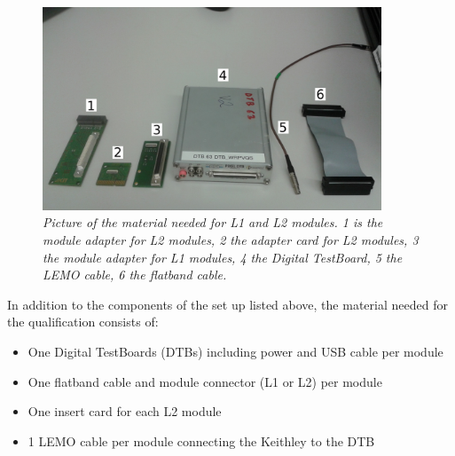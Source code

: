 \documentclass[a4paper,12pt,twoside]{article}
\begin{document}
\begin{figure} [h!] \centering 
\includegraphics[width=0.9\textwidth, angle=0] {./Material.jpg}
\caption{\em  \label{Material}
Picture of the material needed for L1 and L2 modules. 1 is the module adapter for L2 modules, 2 the adapter card for L2 modules, 3 the module adapter for L1 modules, 4 the Digital TestBoard, 5 the LEMO cable, 6 the flatband cable.}
\end{figure}

In addition to the components of the set up listed above, the material needed for the qualification consists of:

\begin{itemize}
\item One Digital TestBoards (DTBs) including power and USB cable per module
\item One flatband cable and module connector (L1 or L2) per module
\item One insert card for each L2 module
\item 1 LEMO cable per module connecting the Keithley to the DTB
\end{itemize}
\end{document}
